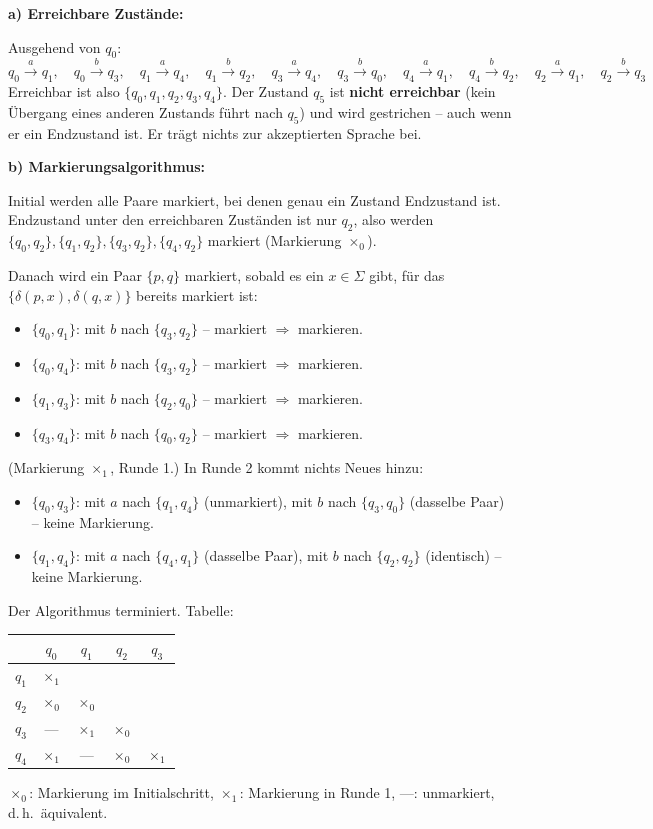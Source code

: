 \begin{loesung}
\textbf{a) Erreichbare Zustände:}

Ausgehend von $q_0$:
\[
  q_0 \xrightarrow{a} q_1,\quad q_0 \xrightarrow{b} q_3,\quad
  q_1 \xrightarrow{a} q_4,\quad q_1 \xrightarrow{b} q_2,\quad
  q_3 \xrightarrow{a} q_4,\quad q_3 \xrightarrow{b} q_0,\quad
  q_4 \xrightarrow{a} q_1,\quad q_4 \xrightarrow{b} q_2,\quad
  q_2 \xrightarrow{a} q_1,\quad q_2 \xrightarrow{b} q_3
\]
Erreichbar ist also $\{q_0, q_1, q_2, q_3, q_4\}$. Der Zustand $q_5$ ist \textbf{nicht erreichbar} (kein Übergang eines anderen Zustands führt nach $q_5$) und wird gestrichen -- auch wenn er ein Endzustand ist. Er trägt nichts zur akzeptierten Sprache bei.

\textbf{b) Markierungsalgorithmus:}

Initial werden alle Paare markiert, bei denen genau ein Zustand Endzustand ist. Endzustand unter den erreichbaren Zuständen ist nur $q_2$, also werden $\{q_0,q_2\}, \{q_1,q_2\}, \{q_3,q_2\}, \{q_4,q_2\}$ markiert (Markierung $\times_0$).

Danach wird ein Paar $\{p,q\}$ markiert, sobald es ein $x\in\Sigma$ gibt, für das $\{\delta(p,x), \delta(q,x)\}$ bereits markiert ist:
\begin{itemize}
  \item $\{q_0,q_1\}$: mit $b$ nach $\{q_3,q_2\}$ -- markiert $\Rightarrow$ markieren.
  \item $\{q_0,q_4\}$: mit $b$ nach $\{q_3,q_2\}$ -- markiert $\Rightarrow$ markieren.
  \item $\{q_1,q_3\}$: mit $b$ nach $\{q_2,q_0\}$ -- markiert $\Rightarrow$ markieren.
  \item $\{q_3,q_4\}$: mit $b$ nach $\{q_0,q_2\}$ -- markiert $\Rightarrow$ markieren.
\end{itemize}
(Markierung $\times_1$, Runde 1.) In Runde 2 kommt nichts Neues hinzu:
\begin{itemize}
  \item $\{q_0,q_3\}$: mit $a$ nach $\{q_1,q_4\}$ (unmarkiert), mit $b$ nach $\{q_3,q_0\}$ (dasselbe Paar) -- keine Markierung.
  \item $\{q_1,q_4\}$: mit $a$ nach $\{q_4,q_1\}$ (dasselbe Paar), mit $b$ nach $\{q_2,q_2\}$ (identisch) -- keine Markierung.
\end{itemize}
Der Algorithmus terminiert. Tabelle:

\begin{center}
\begin{tabular}{c|cccc}
   & $q_0$ & $q_1$ & $q_2$ & $q_3$ \\
  \hline
  $q_1$ & $\times_1$ & & & \\
  $q_2$ & $\times_0$ & $\times_0$ & & \\
  $q_3$ & --- & $\times_1$ & $\times_0$ & \\
  $q_4$ & $\times_1$ & --- & $\times_0$ & $\times_1$ \\
\end{tabular}
\end{center}
\noindent\footnotesize $\times_0$: Markierung im Initialschritt, $\times_1$: Markierung in Runde 1, ---: unmarkiert, d.\,h.\ äquivalent.\normalsize


\end{loesung}
